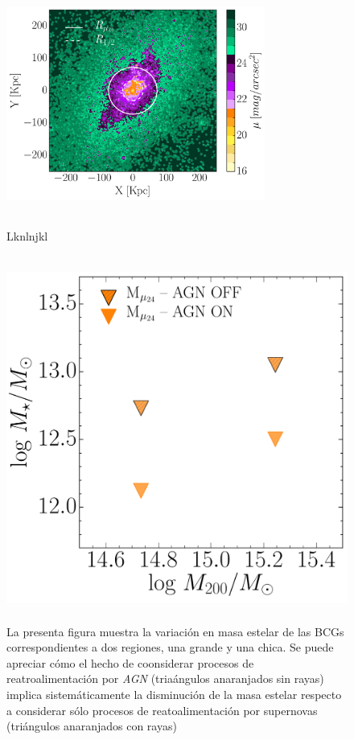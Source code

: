 \begin{figure}[H]
\includegraphics[height=8cm,width=8.5cm,trim={3.1cm 0cm 0cm 0cm},clip]{Figures/d2agn.pdf}
\caption[csfagn]{Lknlnjkl}
\label{fig:csfagn}
\end{figure}

\begin{figure}[H]
\centering
\includegraphics[height=12cm,width=12cm]{Figures/LR/csf_agn.pdf}
\caption[agn]{La presenta figura muestra la variaci\'on en masa estelar de las BCGs correspondientes a dos regiones,
una grande y una chica. Se puede apreciar c\'omo el hecho de coonsiderar procesos de reatroalimentaci\'on
por {\it AGN} (tria\'angulos anaranjados sin rayas) implica sistem\'aticamente la disminuci\'on de la masa
estelar respecto a considerar s\'olo procesos de reatoalimentaci\'on por supernovas (tri\'angulos anaranjados con rayas)}
\label{fig:agn}
\end{figure}


